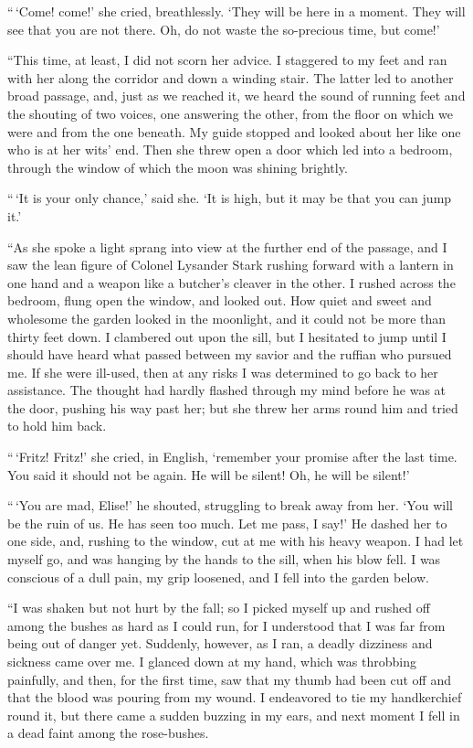 “\,‘Come! come!’ she cried, breathlessly. ‘They will be
here in a moment. They will see that you are not there. Oh,
do not waste the so-precious time, but come!’

“This time, at least, I did not scorn her advice. I staggered
to my feet and ran with her along the corridor and
down a winding stair. The latter led to another broad passage,
and, just as we reached it, we heard the sound of running
feet and the shouting of two voices, one answering the other,
from the floor on which we were and from the one beneath.
My guide stopped and looked about her like one who is at
her wits’ end. Then she threw open a door which led into a
bedroom, through the window of which the moon was shining
brightly.

“\,‘It is your only chance,’ said she. ‘It is high, but it may
be that you can jump it.’

“As she spoke a light sprang into view at the further end
of the passage, and I saw the lean figure of Colonel Lysander
Stark rushing forward with a lantern in one hand and a
weapon like a butcher’s cleaver in the other. I rushed across
the bedroom, flung open the window, and looked out. How
quiet and sweet and wholesome the garden looked in the
moonlight, and it could not be more than thirty feet down. I
clambered out upon the sill, but I hesitated to jump until I
should have heard what passed between my savior and the
ruffian who pursued me. If she were ill-used, then at any
risks I was determined to go back to her assistance. The
thought had hardly flashed through my mind before he was
at the door, pushing his way past her; but she threw her arms
round him and tried to hold him back.

“\,‘Fritz! Fritz!’ she cried, in English, ‘remember your
prom\-ise after the last time. You said it should not be again.
He will be silent! Oh, he will be silent!’

“\,‘You are mad, Elise!’ he shouted, struggling to break
away from her. ‘You will be the ruin of us. He has seen
too much. Let me pass, I say!’ He dashed her to one side,
and, rushing to the window, cut at me with his heavy weapon.
I had let myself go, and was hanging by the hands to the sill,
when his blow fell. I was conscious of a dull pain, my grip
loosened, and I fell into the garden below.

“I was shaken but not hurt by the fall; so I picked myself
up and rushed off among the bushes as hard as I could run,
for I understood that I was far from being out of danger yet.
Suddenly, however, as I ran, a deadly dizziness and sickness
came over me. I glanced down at my hand, which was throbbing
painfully, and then, for the first time, saw that my thumb
had been cut off and that the blood was pouring from my
wound. I endeavored to tie my handkerchief round it, but
there came a sudden buzzing in my ears, and next moment I
fell in a dead faint among the rose-bushes.

